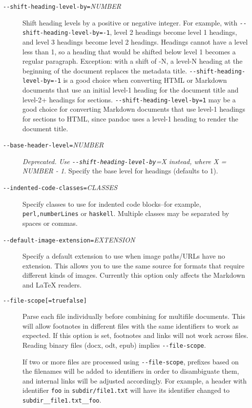 \documentclass[
  a4paper,
]{article}
\begin{document}
\begin{description}
\item[\texttt{-\/-shift-heading-level-by=}\emph{NUMBER}]
Shift heading levels by a positive or negative integer. For example,
with \texttt{-\/-shift-heading-level-by=-1}, level 2 headings become
level 1 headings, and level 3 headings become level 2 headings. Headings
cannot have a level less than 1, so a heading that would be shifted
below level 1 becomes a regular paragraph. Exception: with a shift of
-N, a level-N heading at the beginning of the document replaces the
metadata title. \texttt{-\/-shift-heading-level-by=-1} is a good choice
when converting HTML or Markdown documents that use an initial level-1
heading for the document title and level-2+ headings for sections.
\texttt{-\/-shift-heading-level-by=1} may be a good choice for
converting Markdown documents that use level-1 headings for sections to
HTML, since pandoc uses a level-1 heading to render the document title.
\item[\texttt{-\/-base-header-level=}\emph{NUMBER}]
\emph{Deprecated. Use \texttt{-\/-shift-heading-level-by}=X instead,
where X = NUMBER - 1.} Specify the base level for headings (defaults to
1).
\item[\texttt{-\/-indented-code-classes=}\emph{CLASSES}]
Specify classes to use for indented code blocks--for example,
\texttt{perl,numberLines} or \texttt{haskell}. Multiple classes may be
separated by spaces or commas.
\item[\texttt{-\/-default-image-extension=}\emph{EXTENSION}]
Specify a default extension to use when image paths/URLs have no
extension. This allows you to use the same source for formats that
require different kinds of images. Currently this option only affects
the Markdown and LaTeX readers.
\item[\texttt{-\/-file-scope{[}=true\textbar{}false{]}}]
Parse each file individually before combining for multifile documents.
This will allow footnotes in different files with the same identifiers
to work as expected. If this option is set, footnotes and links will not
work across files. Reading binary files (docx, odt, epub) implies
\texttt{-\/-file-scope}.

If two or more files are processed using \texttt{-\/-file-scope},
prefixes based on the filenames will be added to identifiers in order to
disambiguate them, and internal links will be adjusted accordingly. For
example, a header with identifier \texttt{foo} in
\texttt{subdir/file1.txt} will have its identifier changed to
\texttt{subdir\_\_file1.txt\_\_foo}.


\end{description}
\end{document}
